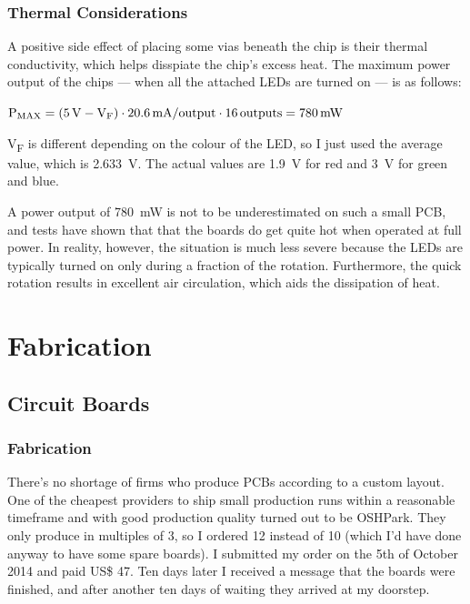 \documentclass[a4paper, 11pt, titlepage]{report}
\newenvironment{ownmath}
{\vspace{2mm}\hspace{15pt}\begin{math}}
{\end{math}\vspace{2mm}}
\begin{document}
\subsection{Thermal Considerations}

A positive side effect of placing some vias beneath the chip is their thermal conductivity, which
helps disspiate the chip's excess heat. The maximum power output of the chips --- when all the
attached LEDs are turned on --- is as follows:

\begin{ownmath}
\textrm{P\textsubscript{MAX}} = (\SI{5}{\volt} - \textrm{V\textsubscript{F}}) \cdot
\SI{20.6}{\milli\ampere\per output} \cdot \SI{16}{outputs} = \SI{780}{\milli\watt}
\end{ownmath}

V\textsubscript{F} is different depending on the colour of the LED, so I just used the average
value, which is \SI{2.633}{\volt}. The actual values are \SI{1.9}{\volt} for red and \SI{3}{\volt}
for green and blue.

A power output of \SI{780}{\milli\watt} is not to be underestimated on such a small PCB, and tests
have shown that that the boards do get quite hot when operated at full power. In reality, however,
the situation is much less severe because the LEDs are typically turned on only during a fraction
of the rotation. Furthermore, the quick rotation results in excellent air circulation, which aids
the dissipation of heat.









\chapter{Fabrication}

\section{Circuit Boards}

\subsection{Fabrication}

There's no shortage of firms who produce PCBs according to a custom layout. One of the cheapest
providers to ship small production runs within a reasonable timeframe and with good production
quality turned out to be OSHPark. They only produce in multiples of 3, so I ordered 12 instead of
10 (which I'd have done anyway to have some spare boards). I submitted my order on the 5th of
October 2014 and paid US\$ 47. Ten days later I received a message that the boards were finished,
and after another ten days of waiting they arrived at my doorstep.
\end{document}
